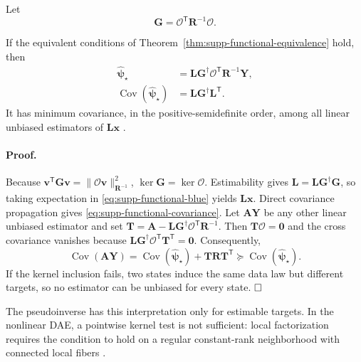 Let
\begin{equation}
 \bm G=\mathcal O^{\mathsf T}\bm R^{-1}\mathcal O.
 \label{eq:supp-information-gramian}
\end{equation}

\begin{theorem}
If the equivalent conditions of Theorem~\ref{thm:supp-functional-equivalence} hold, then
\begin{align}
 \widehat{\bm\psi}_{\star}
 &=\bm L\bm G^{\dagger}\mathcal O^{\mathsf T}\bm R^{-1}\bm Y,
 \label{eq:supp-functional-blue}\\
 \operatorname{Cov}(\widehat{\bm\psi}_{\star})
 &=\bm L\bm G^{\dagger}\bm L^{\mathsf T}.
 \label{eq:supp-functional-covariance}
\end{align}
It has minimum covariance, in the positive-semidefinite order, among all linear unbiased estimators of $\bm L\bm x$ \cite{kay1993estimation}.
\label{thm:supp-functional-blue}
\end{theorem}

\paragraph{Proof.}
Because
$\bm v^{\mathsf T}\bm G\bm v=\|\mathcal O\bm v\|_{\bm R^{-1}}^2$,
$\ker\bm G=\ker\mathcal O$. Estimability gives
$\bm L=\bm L\bm G^{\dagger}\bm G$, so taking expectation in \eqref{eq:supp-functional-blue} yields $\bm L\bm x$. Direct covariance propagation gives \eqref{eq:supp-functional-covariance}. Let $\bm A\bm Y$ be any other linear unbiased estimator and set
$\bm T=\bm A-\bm L\bm G^{\dagger}\mathcal O^{\mathsf T}\bm R^{-1}$.
Then $\bm T\mathcal O=\bm0$ and the cross covariance vanishes because
$\bm L\bm G^{\dagger}\mathcal O^{\mathsf T}\bm T^{\mathsf T}=\bm0$.
Consequently,
\begin{equation}
 \operatorname{Cov}(\bm A\bm Y)
 =\operatorname{Cov}(\widehat{\bm\psi}_{\star})
 +\bm T\bm R\bm T^{\mathsf T}
 \succeq\operatorname{Cov}(\widehat{\bm\psi}_{\star}).
\end{equation}
If the kernel inclusion fails, two states induce the same data law but different targets, so no estimator can be unbiased for every state. $\hfill\square$

The pseudoinverse has this interpretation only for estimable targets. In the nonlinear DAE, a pointwise kernel test is not sufficient: local factorization requires the condition to hold on a regular constant-rank neighborhood with connected local fibers \cite{montanari2022functional}.

